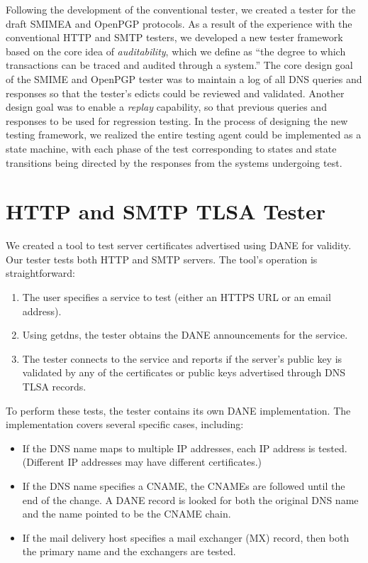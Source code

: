 \documentclass[preprint,5p]{elsarticle}
\begin{document}
Following the development of the conventional tester, we created a
tester for the draft SMIMEA and OpenPGP protocols. As a result of the
experience with the conventional HTTP and SMTP testers, we developed a
new tester framework based on the core idea of \emph{auditability},
which we define as ``the degree to which transactions can be traced
and audited through a system.'' The core design goal of the SMIME and
OpenPGP tester was to maintain a log of all DNS queries and responses
so that the tester's edicts could be reviewed and validated. Another
design goal was to enable a \emph{replay} capability, so that previous
queries and responses to be used for regression testing. In the
process of designing the new testing framework, we realized the entire
testing agent could be implemented as a state machine, with each phase
of the test corresponding to states and state transitions being
directed by the responses from the systems undergoing test.


\section{HTTP and SMTP TLSA Tester}
We created a tool to test server certificates advertised using DANE
for validity. Our tester tests both HTTP and SMTP servers. The tool's
operation is straightforward:

\begin{enumerate}
\item The user specifies a service to test (either an HTTPS URL or an
  email address).
\item Using getdns, the tester obtains the DANE announcements for the
  service. 
\item The tester connects to the service and reports if the server's
  public key is validated by any of the   certificates or public keys
  advertised through DNS TLSA records. 
\end{enumerate}

To perform these tests, the tester contains its own DANE
implementation. The implementation covers several specific cases,
including:

\begin{itemize}
\item If the DNS name maps to multiple IP addresses, each IP address
  is tested. (Different IP addresses may have different certificates.)
\item If the DNS name specifies a CNAME, the CNAMEs are followed until
  the end of the change. A DANE record is looked for both the original
  DNS name and the name pointed to be the CNAME chain.
\item If the mail delivery host specifies a mail exchanger (MX)
  record, then both the primary name and the exchangers are tested.
\end{itemize}
\end{document}

